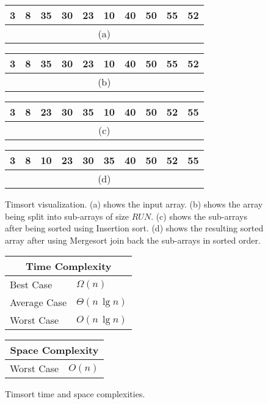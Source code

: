 \begin{figure}[!ht]
    \centering
    \begin{tabular}{|c|c|c|c|c|c|c|c|c|c|}
    \hline
    3 & 8 & 35 & 30 & 23 & 10 & 40 & 50 & 55 & 52 \\
    \hline
    \multicolumn{10}{c}{(a)} \\
    \end{tabular}
    \break
    \begin{tabular}{|c|c|c|c|c|c|c|c|c|c|}
    \hline
    3 & 8 & 35 & 30 & 23 & \cellcolor{lightgray}10 & \cellcolor{lightgray}40 & \cellcolor{lightgray}50 & \cellcolor{lightgray}55 & \cellcolor{lightgray}52 \\
    \hline
    \multicolumn{10}{c}{(b)} \\
    \end{tabular}
    \break
    \begin{tabular}{|c|c|c|c|c|c|c|c|c|c|}
    \hline
    3 & 8 & 23 & 30 & 35 & \cellcolor{lightgray}10 & \cellcolor{lightgray}40 & \cellcolor{lightgray}50 & \cellcolor{lightgray}52 & \cellcolor{lightgray}55 \\
    \hline
    \multicolumn{10}{c}{(c)} \\
    \end{tabular}
    \break
    \begin{tabular}{|c|c|c|c|c|c|c|c|c|c|}
    \hline
    \cellcolor{lightgray}3 & \cellcolor{lightgray}8 & \cellcolor{lightgray}10 & \cellcolor{lightgray}23 & \cellcolor{lightgray}30 & \cellcolor{lightgray}35 & \cellcolor{lightgray}40 & \cellcolor{lightgray}50 & \cellcolor{lightgray}52 & \cellcolor{lightgray}55 \\
    \hline
    \multicolumn{10}{c}{(d)} \\
    \end{tabular}
    
    \caption{Timsort visualization. (a) shows the input array. (b) shows the array being split into sub-arrays of size $RUN$. (c) shows the sub-arrays after being sorted using Insertion sort. (d) shows the resulting sorted array after using Mergesort join back the sub-arrays in sorted order.}
    \label{fig:timsort_ex}
\end{figure}

\begin{figure}[!ht]
    \centering
    \begin{tabular}{l|l}
    \multicolumn{2}{c}{\textbf{Time Complexity}} \\
    \hline
    Best Case    & $\Omega(n)$ \\
    Average Case & $\Theta(n \, \lg n)$ \\
    Worst Case   & $O(n \, \lg n)$ \\
    \end{tabular}
    \quad\quad
    \begin{tabular}{l|l}
    \multicolumn{2}{c}{\textbf{Space Complexity}} \\
    \hline
    Worst Case   & $O(n)$
    \end{tabular}
    
    \caption{Timsort time\cite{ajnp2017} and space complexities\cite{big-o}.}
    \label{fig:timsort}
\end{figure}
